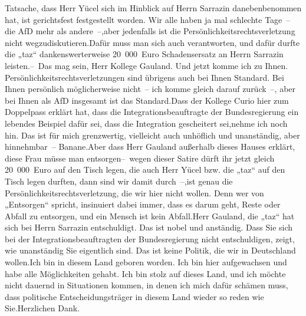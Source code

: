 \documentclass{article}
\begin{document}
Tatsache, dass Herr Yücel sich im Hinblick auf Herrn Sarrazin danebenbenommen hat, ist gerichtsfest festgestellt worden. Wir alle haben ja mal schlechte Tage – die AfD mehr als andere –,aber jedenfalls ist die Persönlichkeitsrechtsverletzung nicht wegzudiskutieren.Dafür muss man sich auch verantworten, und dafür durfte die „taz“ dankenswerterweise 20 000 Euro Schadensersatz an Herrn Sarrazin leisten.– Das mag sein, Herr Kollege Gauland. Und jetzt komme ich zu Ihnen. Persönlichkeitsrechtsverletzungen sind übrigens auch bei Ihnen Standard. Bei Ihnen persönlich möglicherweise nicht – ich komme gleich darauf zurück –, aber bei Ihnen als AfD insgesamt ist das Standard.Dass der Kollege Curio hier zum Doppelpass erklärt hat, dass die Integrationsbeauftragte der Bundesregierung ein lebendes Beispiel dafür sei, dass die Integration gescheitert sei,nehme ich noch hin. Das ist für mich grenzwertig, vielleicht auch unhöflich und unanständig, aber hinnehmbar – Banane.Aber dass Herr Gauland außerhalb dieses Hauses erklärt, diese Frau müsse man entsorgen– wegen dieser Satire dürft ihr jetzt gleich 20 000 Euro auf den Tisch legen, die auch Herr Yücel bzw. die „taz“ auf den Tisch legen durften, dann sind wir damit durch –,ist genau die Persönlichkeitsrechtsverletzung, die wir hier nicht wollen. Denn wer von „Entsorgen“ spricht, insinuiert dabei immer, dass es darum geht, Reste oder Abfall zu entsorgen, und ein Mensch ist kein Abfall.Herr Gauland, die „taz“ hat sich bei Herrn Sarrazin entschuldigt. Das ist nobel und anständig. Dass Sie sich bei der Integrationsbeauftragten der Bundesregierung nicht entschuldigen, zeigt, wie unanständig Sie eigentlich sind. Das ist keine Politik, die wir in Deutschland wollen.Ich bin in diesem Land geboren worden. Ich bin hier aufgewachsen und habe alle Möglichkeiten gehabt. Ich bin stolz auf dieses Land, und ich möchte nicht dauernd in Situationen kommen, in denen ich mich dafür schämen muss, dass politische Entscheidungsträger in diesem Land wieder so reden wie Sie.Herzlichen Dank.
\end{document}
